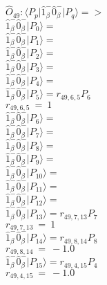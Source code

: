 \documentclass[14pt]{article}
\begin{document}
    $\hat{O}_{49}:  \langle{P_p}\vert \hat{1}_{\beta}^{-}\hat{0}_{\beta}^{-} \vert{P_q}\rangle => $ \\ 
    $ \hat{1}_{\beta}^{-}\hat{0}_{\beta}^{-} \vert{P_{0}}\rangle =  $ \\ 
    $ \hat{1}_{\beta}^{-}\hat{0}_{\beta}^{-} \vert{P_{1}}\rangle =  $ \\ 
    $ \hat{1}_{\beta}^{-}\hat{0}_{\beta}^{-} \vert{P_{2}}\rangle =  $ \\ 
    $ \hat{1}_{\beta}^{-}\hat{0}_{\beta}^{-} \vert{P_{3}}\rangle =  $ \\ 
    $ \hat{1}_{\beta}^{-}\hat{0}_{\beta}^{-} \vert{P_{4}}\rangle =  $ \\ 
    $ \hat{1}_{\beta}^{-}\hat{0}_{\beta}^{-} \vert{P_{5}}\rangle = {r}_{49,6,5}P_{6} $ \\ 
    ${r}_{49,6,5}\ =\ 1 $ \\ 
    $ \hat{1}_{\beta}^{-}\hat{0}_{\beta}^{-} \vert{P_{6}}\rangle =  $ \\ 
    $ \hat{1}_{\beta}^{-}\hat{0}_{\beta}^{-} \vert{P_{7}}\rangle =  $ \\ 
    $ \hat{1}_{\beta}^{-}\hat{0}_{\beta}^{-} \vert{P_{8}}\rangle =  $ \\ 
    $ \hat{1}_{\beta}^{-}\hat{0}_{\beta}^{-} \vert{P_{9}}\rangle =  $ \\ 
    $ \hat{1}_{\beta}^{-}\hat{0}_{\beta}^{-} \vert{P_{10}}\rangle =  $ \\ 
    $ \hat{1}_{\beta}^{-}\hat{0}_{\beta}^{-} \vert{P_{11}}\rangle =  $ \\ 
    $ \hat{1}_{\beta}^{-}\hat{0}_{\beta}^{-} \vert{P_{12}}\rangle =  $ \\ 
    $ \hat{1}_{\beta}^{-}\hat{0}_{\beta}^{-} \vert{P_{13}}\rangle = {r}_{49,7,13}P_{7} $ \\ 
    ${r}_{49,7,13}\ =\ 1 $ \\ 
    $ \hat{1}_{\beta}^{-}\hat{0}_{\beta}^{-} \vert{P_{14}}\rangle = {r}_{49,8,14}P_{8} $ \\ 
    ${r}_{49,8,14}\ =\ -1.0 $ \\ 
    $ \hat{1}_{\beta}^{-}\hat{0}_{\beta}^{-} \vert{P_{15}}\rangle = {r}_{49,4,15}P_{4} $ \\ 
    ${r}_{49,4,15}\ =\ -1.0 $ \\ 
    
\end{document}
